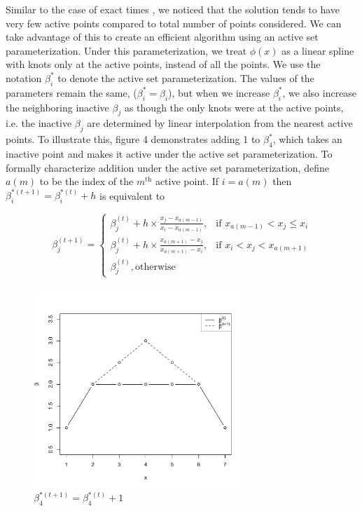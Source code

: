 	Similar to the case of exact times \cite{RefRuf2007}, we noticed that the solution tends to have very few active points compared to total number of points considered. We can take advantage of this to create an efficient algorithm using an active set parameterization. Under this parameterization, we treat $\phi(x)$ as a linear spline with knots only at the active points, instead of all the points. We use the notation $\beta_i^*$ to denote the active set parameterization. The values of the parameters remain the same,  ($\beta_i^* = \beta_i$), but when we increase $\beta_i^*$, we also increase the neighboring inactive $\beta_j$ as though the only knots were at the active points, i.e. the inactive $\beta_j$ are determined by linear interpolation from the nearest active points. To illustrate this, figure 4 demonstrates adding 1 to $\beta_4^*$, which takes an inactive point and makes it active under the active set parameterization. To formally characterize addition under the active set parameterization, define $a(m)$ to be the index of the $m^{\text{th}}$ active point. If $i = a(m)$ then $\beta_i^{*(t+1)} = \beta_i^{*(t)} + h$ is equivalent to 
		
	\[
	\beta^{(t+1)}_j = 
	\begin{cases}
		\beta^{(t)}_j + h \times \frac{x_j - x_{a(m-1)} } {x_{i} - x_{a(m-1)} } , &  \textrm{if } x_{a(m-1)} < x_j  \leq x_{i} \\  
		\beta^{(t)}_j + h \times \frac{x_{a(m+1)} - x_j} {x_{a(m+1)} - x_{i} }, & \textrm{if } x_{ i} < x_j < x_{a(m+1)} \\ 
		\beta^{(t)}_j,  \textrm{otherwise}
	\end{cases}
	\]

	
\begin{figure}[h]
\centerline{\includegraphics[width = 8cm]{ActivePoint.pdf}}
\caption{$\beta_4^{*(t+1)} = \beta_4^{*(t) }+1$}
\label{figure:ActPt}
\end{figure}		
		
